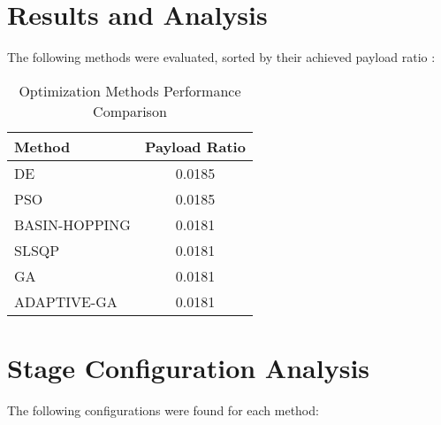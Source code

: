 \documentclass[11pt]{article}
\begin{document}
\section{Results and Analysis}
The following methods were evaluated, sorted by their achieved payload ratio \cite{pso_ascent_2013}:

\begin{table}[H]
\centering
\caption{Optimization Methods Performance Comparison}
\begin{tabular}{lc}
\toprule
Method & Payload Ratio \\
\midrule
DE & 0.0185 \\
PSO & 0.0185 \\
BASIN-HOPPING & 0.0181 \\
SLSQP & 0.0181 \\
GA & 0.0181 \\
ADAPTIVE-GA & 0.0181 \\
\bottomrule
\end{tabular}
\end{table}

\section{Stage Configuration Analysis}
The following configurations were found for each method:
\end{document}

